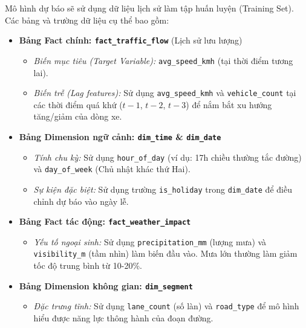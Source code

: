 Mô hình dự báo sẽ sử dụng dữ liệu lịch sử làm tập huấn luyện (Training Set). Các bảng và trường dữ liệu cụ thể bao gồm:
\begin{itemize}
    \item \textbf{Bảng Fact chính: \texttt{fact\_traffic\_flow}} (Lịch sử lưu lượng)
    \begin{itemize}
        \item \textit{Biến mục tiêu (Target Variable):} \texttt{avg\_speed\_kmh} (tại thời điểm tương lai).
        \item \textit{Biến trễ (Lag features):} Sử dụng \texttt{avg\_speed\_kmh} và \texttt{vehicle\_count} tại các thời điểm quá khứ ($t-1$, $t-2$, $t-3$) để nắm bắt xu hướng tăng/giảm của dòng xe.
    \end{itemize}

    \item \textbf{Bảng Dimension ngữ cảnh: \texttt{dim\_time} \& \texttt{dim\_date}}
    \begin{itemize}
        \item \textit{Tính chu kỳ:} Sử dụng \texttt{hour\_of\_day} (ví dụ: 17h chiều thường tắc đường) và \texttt{day\_of\_week} (Chủ nhật khác thứ Hai).
        \item \textit{Sự kiện đặc biệt:} Sử dụng trường \texttt{is\_holiday} trong \texttt{dim\_date} để điều chỉnh dự báo vào ngày lễ.
    \end{itemize}

    \item \textbf{Bảng Fact tác động: \texttt{fact\_weather\_impact}}
    \begin{itemize}
        \item \textit{Yếu tố ngoại sinh:} Sử dụng \texttt{precipitation\_mm} (lượng mưa) và \texttt{visibility\_m} (tầm nhìn) làm biến đầu vào. Mưa lớn thường làm giảm tốc độ trung bình từ 10-20\%.
    \end{itemize}

    \item \textbf{Bảng Dimension không gian: \texttt{dim\_segment}}
    \begin{itemize}
        \item \textit{Đặc trưng tĩnh:} Sử dụng \texttt{lane\_count} (số làn) và \texttt{road\_type} để mô hình hiểu được năng lực thông hành của đoạn đường.
    \end{itemize}
\end{itemize}

